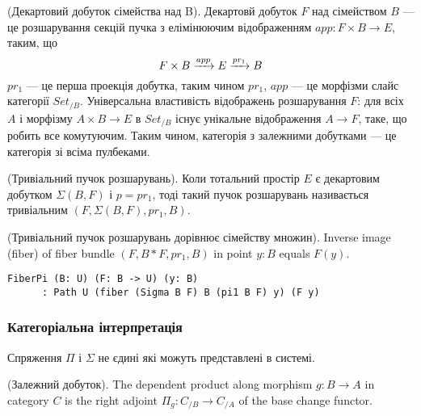 \begin{definition} (Декартовий добуток сімейства над B).
Декартовй добуток $F$ над сімейством $B$ — це розшарування секцій пучка з елімінюючим відображенням $app : F \times B \rightarrow E$, таким, що
\begin{equation}
F \times B \xrightarrow{{app}} E \xrightarrow{{pr_1}} B
\end{equation}
$pr_1$ — це перша проекція добутка, таким чином $pr_1$, $app$ — це морфізми
слайс категорії $Set_{/B}$. Універсальна властивість відображень розшарування $F$:
для всіх $A$ і морфізму $A \times B \rightarrow E$ в $Set_{/B}$ існує
унікальне відображення $A \rightarrow F$, таке, що робить все комутуючим.
Таким чином, категорія з залежними добутками — це категорія зі всіма пулбеками.
\end{definition}

\begin{definition} (Тривіальний пучок розшарувань).
Коли тотальний простір $E$ є декартовим добутком $\Sigma(B,F)$ і $p = pr_1$,
тоді такий пучок розшарувань називається тривіальним $(F,\Sigma(B,F),pr_1,B)$.
\end{definition}


\begin{theorem} (Тривіальний пучок розшарувань дорівнює сімейству множин).
Inverse image (fiber) of fiber bundle $(F,B*F,pr_1,B)$ in point $y:B$ equals $F(y)$.
\begin{lstlisting}
FiberPi (B: U) (F: B -> U) (y: B)
      : Path U (fiber (Sigma B F) B (pi1 B F) y) (F y)
\end{lstlisting}
\end{theorem}

\subsubsection*{Категоріальна інтерпретація}
Спряження $\Pi$ і $\Sigma$ не єдині які можуть представлені в системі.

\begin{definition} (Залежний добуток).
The dependent product along morphism $g: B \rightarrow A$ in category $C$ is the right
adjoint $\Pi_g : C_{/B} \rightarrow C_{/A}$ of the base change functor.
\end{definition}

